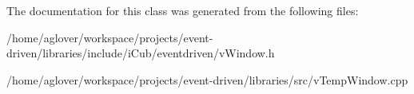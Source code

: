 The documentation for this class was generated from the following files\+:\begin{DoxyCompactItemize}
\item 
/home/aglover/workspace/projects/event-\/driven/libraries/include/i\+Cub/eventdriven/v\+Window.\+h\item 
/home/aglover/workspace/projects/event-\/driven/libraries/src/v\+Temp\+Window.\+cpp\end{DoxyCompactItemize}
